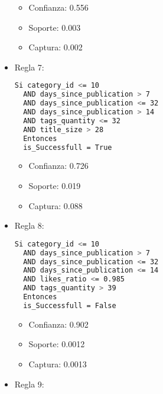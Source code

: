 \begin{itemize}
    \begin{itemize}
      \item Confianza: 0.556
      \item Soporte: 0.003
      \item Captura: 0.002
    \end{itemize}

  \item Regla 7:

\begin{lstlisting}[language=bash, numbers=none]
  Si category_id <= 10
  AND days_since_publication > 7
  AND days_since_publication <= 32
  AND days_since_publication > 14
  AND tags_quantity <= 32
  AND title_size > 28
  Entonces
  is_Successfull = True
\end{lstlisting}

    \begin{itemize}
      \item Confianza: 0.726
      \item Soporte: 0.019
      \item Captura: 0.088
    \end{itemize}

  \item Regla 8:

\begin{lstlisting}[language=bash, numbers=none]
  Si category_id <= 10
  AND days_since_publication > 7
  AND days_since_publication <= 32
  AND days_since_publication <= 14
  AND likes_ratio <= 0.985
  AND tags_quantity > 39
  Entonces
  is_Successfull = False

\end{lstlisting}

    \begin{itemize}
      \item Confianza: 0.902
      \item Soporte: 0.0012
      \item Captura: 0.0013
    \end{itemize}

  \item Regla 9:


\end{itemize}
